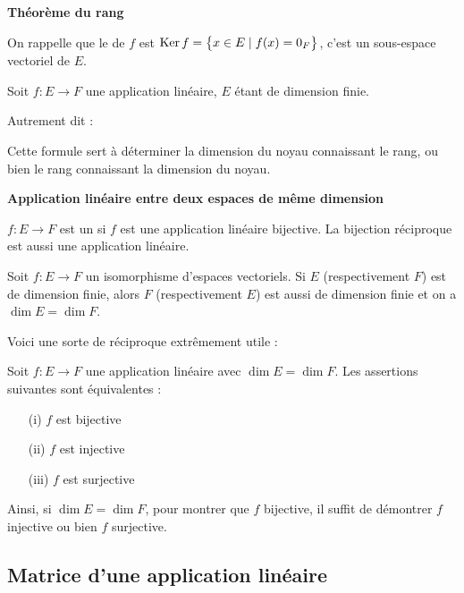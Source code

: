 \documentclass[10pt,class=article,crop=false]{standalone}
\begin{document}
\begin{multicols}{2}
\textbf{Théorème du rang}

On rappelle que le  de $f$ est $\operatorname{Ker} f=\big\{x \in E \mid f(x)=0_{F}\big\}$,  c'est un sous-espace vectoriel de $E$.
	
\begin{theoreme}
Soit $f : E \to F$ une application linéaire,
$E$ étant de dimension finie.
\end{theoreme}

Autrement dit : 

Cette formule sert à déterminer la dimension du noyau
connaissant le rang, ou bien le rang connaissant la dimension du noyau.



\textbf{Application linéaire entre deux espaces de même dimension}


$f : E \to F$ est un  si $f$ est une application linéaire bijective. La bijection réciproque est aussi une application linéaire.
\begin{proposition}
	Soit $f : E \to F$ un isomorphisme d'espaces vectoriels.
	Si $E$ (respectivement $F$) est de dimension finie, alors
	$F$ (respectivement $E$) est aussi de dimension finie
	et on a $\dim E =\dim F$.
\end{proposition}



Voici une sorte de réciproque extrêmement utile :
\begin{theoreme}
	\label{th:eqapplinbij}
	Soit $f : E \to F$ une application linéaire avec  $\dim E = \dim F$. 
	Les assertions suivantes sont équivalentes :
	\begin{itemize}
		\item[(i)] $f$ est bijective
		\item[(ii)] $f$ est injective
		\item[(iii)] $f$ est surjective
	\end{itemize}
\end{theoreme}

Ainsi, si $\dim E=\dim F$, pour montrer 
que $f$ bijective, il suffit de démontrer $f$ injective ou bien $f$ surjective.

\subsection{Matrice d'une application linéaire}





\end{multicols}
\end{document}
